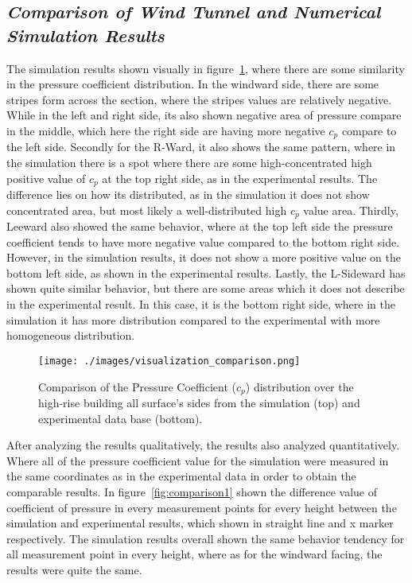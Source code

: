 \documentclass[12pt,a4paper]{cibb}
\begin{document}
\subsection{\bf \it Comparison of Wind Tunnel and Numerical Simulation Results}
The simulation results shown visually in figure~\ref{fig:visualizecomparison}, where there are some similarity in the pressure coefficient distribution. In the windward side, there are some stripes form across the section, where the stripes values are relatively negative. While in the left and right side, its also shown negative area of pressure compare in the middle, which here the right side are having more negative $c_p$ compare to the left side. Secondly for the R-Ward, it also shows the same pattern, where in the simulation there is a spot where there are some high-concentrated high positive value of $c_p$ at the top right side, as in the experimental results. The difference lies on how its distributed, as in the simulation it does not show concentrated area, but most likely a well-distributed high $c_p$ value area. Thirdly, Leeward also showed the same behavior, where at the top left side the pressure coefficient tends to have more negative value compared to the bottom right side. However, in the simulation results, it does not show a more positive value on the bottom left side, as shown in the experimental results. Lastly, the L-Sideward has shown quite similar behavior, but there are some areas which it does not describe in the experimental result. In this case, it is the bottom right side, where in the simulation it has more distribution compared to the experimental with more homogeneous distribution. 

\begin{figure}[h]
\vspace{1mm}
 \begin{center}
\texttt{[image: ./images/visualization\_comparison.png]}
\caption{
Comparison of the Pressure Coefficient ($c_p$) distribution over the high-rise building all surface's sides from the simulation (top) and experimental data base (bottom).}
\label{fig:visualizecomparison}
\vspace{-5mm}
\end{center}
\end{figure}

After analyzing the results qualitatively, the results also analyzed quantitatively. Where all of the pressure coefficient value for the simulation were measured in the same coordinates as in the experimental data in order to obtain the comparable results. In figure~\ref{fig:comparison1} shown the difference value of coefficient of pressure in every measurement points for every height between the simulation and experimental results, which shown in straight line and x marker respectively. The simulation results overall shown the same behavior tendency for all measurement point in every height, where as for the windward facing, the results were quite the same.  
\end{document}
